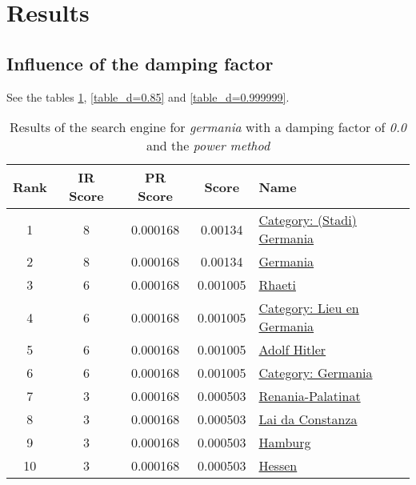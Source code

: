 \documentclass[pdftex,12pt,a4paper]{article}
\begin{document}
\section{Results}

\subsection{Influence of the damping factor}

See the tables \ref{table_d=0.0}, \ref{table_d=0.85} and \ref{table_d=0.999999}.

\begin{table}[H]
\centering
\begin{tabular}{ | c | c | c | c | l | }
\hline
Rank & IR Score & PR Score &  Score & Name \\ \hline
1 & 8 & 0.000168 & 0.00134 & \href{http://rm.wikipedia.org/wiki/Category~(Stadi)_Germania_d640}{Category: (Stadi) Germania} \\ \hline
2 & 8 & 0.000168 & 0.00134 & \href{http://rm.wikipedia.org/wiki/Germania}{Germania} \\ \hline
3 & 6 & 0.000168 & 0.001005 & \href{http://rm.wikipedia.org/wiki/Rhaeti}{Rhaeti} \\ \hline
4 & 6 & 0.000168 & 0.001005 & \href{http://rm.wikipedia.org/wiki/Category:Lieu_en_Germania}{Category: Lieu en Germania} \\ \hline
5 & 6 & 0.000168 & 0.001005 & \href{http://rm.wikipedia.org/wiki/Adolf_Hitler}{Adolf Hitler} \\ \hline
6 & 6 & 0.000168 & 0.001005 & \href{http://rm.wikipedia.org/wiki/Category:Germania}{Category: Germania} \\ \hline
7 & 3 & 0.000168 & 0.000503 & \href{http://rm.wikipedia.org/wiki/Renania-Palatinat}{Renania-Palatinat} \\ \hline
8 & 3 & 0.000168 & 0.000503 & \href{http://rm.wikipedia.org/wiki/Lai_da_Constanza}{Lai da Constanza} \\ \hline
9 & 3 & 0.000168 & 0.000503 & \href{http://rm.wikipedia.org/wiki/Hamburg}{Hamburg} \\ \hline
10 & 3 & 0.000168 & 0.000503 & \href{http://rm.wikipedia.org/wiki/Hessen}{Hessen} \\ \hline
\end{tabular}
\caption{Results of the search engine for \emph{germania} with a damping factor of \emph{0.0} and the \emph{power method}}
\label{table_d=0.0}
\end{table}
\end{document}
